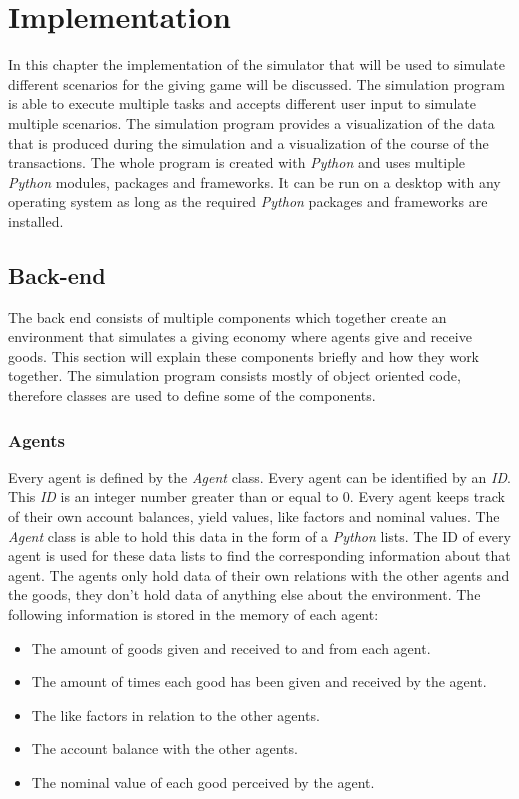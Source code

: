 \documentclass[twoside,openright]{uva-bachelor-thesis}
\begin{document}
\chapter{Implementation}
In this chapter the implementation of the simulator that will be used to simulate different scenarios for the giving game will be discussed. The simulation program is able to execute multiple tasks and accepts different user input to simulate multiple scenarios. The simulation program provides a visualization of the data that is produced during the simulation and a visualization of the course of the transactions. The whole program is created with \textit{Python} and uses multiple \textit{Python} modules, packages and frameworks. It can be run on a desktop with any operating system as long as the required \textit{Python} packages and frameworks are installed. 

\section{Back-end}
The back end consists of multiple components which together create an environment that simulates a giving economy where agents give and receive goods. This section will explain these components briefly and how they work together. The simulation program consists mostly of object oriented code, therefore classes are used to define some of the components.

\subsection{Agents}
Every agent is defined by the \textit{Agent} class. Every agent can be identified by an \textit{ID}. This \textit{ID} is an integer number greater than or equal to 0. Every agent keeps track of their own account balances, yield values, like factors and nominal values. The \textit{Agent} class is able to hold this data in the form of a \textit{Python} lists. The ID of every agent is used for these data lists to find the corresponding information about that agent. The agents only hold data of their own relations with the other agents and the goods, they don't hold data of anything else about the environment. The following information is stored in the memory of each agent:
\begin{itemize}
\item The amount of goods given and received to and from each agent.
\item The amount of times each good has been given and received by the agent.
\item The like factors in relation to the other agents.
\item The account balance with the other agents.
\item The nominal value of each good perceived by the agent.
\end{itemize}
\end{document}
